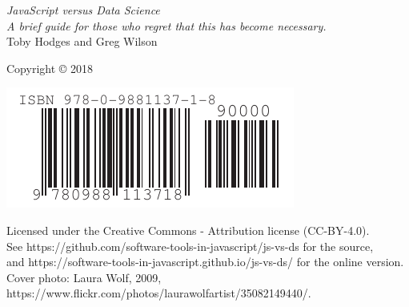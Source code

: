\documentclass[10pt,letterpaper]{memoir}
\begin{document}
\pagestyle{empty}

{\begingroup
  \raggedleft
  \vspace*{\baselineskip}

  {\Huge\itshape JavaScript versus Data Science}\\[\baselineskip]

  {\large\itshape
    A brief guide for those who regret that this has become necessary.
  }\\[0.2\textheight]

  {\large Toby Hodges and Greg Wilson}\par

  \vfill

  {\large Copyright {\copyright} 2018}

  \vspace*{\baselineskip}

  \includegraphics{../../etc/isbn-barcode.pdf}

  \vspace*{\baselineskip}

  {\small
    Licensed under the Creative Commons - Attribution license (CC-BY-4.0).
    \\
    See https://github.com/software-tools-in-javascript/js-vs-ds for the source,
    \\
    and https://software-tools-in-javascript.github.io/js-vs-ds/ for the online version.
    \\
    Cover photo: Laura Wolf, 2009, https://www.flickr.com/photos/laurawolfartist/35082149440/.
  }

\endgroup}

\newpage

\pagestyle{empty}

~

\newpage

\tableofcontents

\newpage

\pagestyle{empty}

~

\newpage

\pagestyle{plain}


\end{document}
